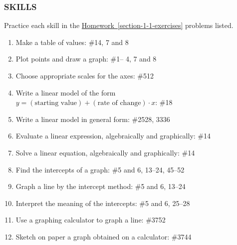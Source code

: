 \documentclass[10pt,]{book}
\theoremstyle{plain}
\theoremstyle{definition}
\theoremstyle{definition}
\theoremstyle{definition}
\theoremstyle{definition}
\numberwithin{equation}{part}
\begin{document}
\subsubsection[{SKILLS}]{SKILLS}\label{subsubsection-4}
Practice each skill in the \hyperref[section-1-1-exercises]{Homework~\ref{section-1-1-exercises}} problems listed. \leavevmode%
\begin{enumerate}[label=\arabic*]
\item\hypertarget{li-112}{}Make a table of values: \#1\textendash{}4, 7 and 8%
\item\hypertarget{li-113}{}Plot points and draw a graph: \#1– 4, 7 and 8%
\item\hypertarget{li-114}{}Choose appropriate scales for the axes: \#5\textendash{}12%
\item\hypertarget{li-115}{}Write a linear model of the form \(y = (\text{starting value}) + (\text{rate of change})\cdot x\): \#1\textendash{}8%
\item\hypertarget{li-116}{}Write a linear model in general form: \#25\textendash{}28, 33\textendash{}36%
\item\hypertarget{li-117}{}Evaluate a linear expression, algebraically and graphically: \#1\textendash{}4%
\item\hypertarget{li-118}{}Solve a linear equation, algebraically and graphically: \#1\textendash{}4%
\item\hypertarget{li-119}{}Find the intercepts of a graph: \#5 and 6, 13–24, 45–52%
\item\hypertarget{li-120}{}Graph a line by the intercept method: \#5 and 6, 13–24%
\item\hypertarget{li-121}{}Interpret the meaning of the intercepts: \#5 and 6, 25–28%
\item\hypertarget{li-122}{}Use a graphing calculator to graph a line: \#37\textendash{}52%
\item\hypertarget{li-123}{}Sketch on paper a graph obtained on a calculator: \#37\textendash{}44%
\end{enumerate}
%
\typeout{************************************************}
\typeout{************************************************}
\end{document}
